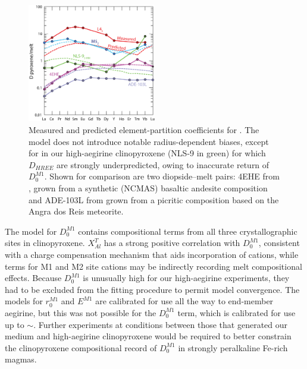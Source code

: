 \documentclass[review,authoryear,12pt]{elsarticle}
\begin{document}
	   	   \begin{figure}[btp]
        \begin{center}
        \includegraphics[width=0.5\textwidth]{14_SpiderDTest.eps}
        \caption[Measured (solid line) and predicted (dashed line) element-partitioning coefficients for ]{Measured and predicted element-partition coefficients for . The model does not introduce notable radius-dependent biases, except for in our high-aegirine clinopyroxene (NLS-9 in green) for which $D_{HREE}$ are strongly underpredicted, owing to inaccurate return of $D_0^{M1}$. Shown for comparison are two diopside--melt pairs: 4EHE from \citet{Hill2000}, grown from a synthetic (NCMAS) basaltic andesite composition and ADE-103L from \citet{Lofgren2006} grown from a picritic composition based on the Angra dos Reis meteorite.}
        \label{14_REEradius}
        \end{center}
        \end{figure}

The model for $D_0^{M1}$ contains compositional terms from all three crystallographic sites in clinopyroxene. $X^T_{Al}$ has a strong positive correlation with $D_0^{M1}$, consistent with a charge compensation mechanism that aids incorporation of  cations, while terms for M1  and M2 site cations may be indirectly recording melt compositional effects. Because $D_0^{M1}$ is unusually high for our high-aegirine experiments, they had to be excluded from the fitting procedure to permit model convergence. The models for $r_0^{M1}$ and $E^{M1}$ are calibrated for use all the way to end-member aegirine, but this was not possible for the $D_0^{M1}$ term, which is calibrated for use up to $\sim$. Further experiments at conditions between those that generated our medium and high-aegirine clinopyroxene would be required to better constrain the clinopyroxene compositional record of $D_0^{M1}$ in strongly peralkaline Fe-rich magmas.
\end{document}
